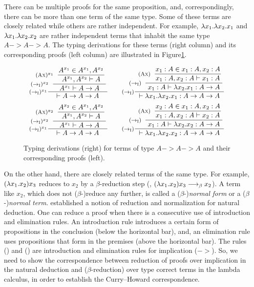 There can be multiple proofs for the same proposition, and,
correspondingly, there can be more than one term of the same type.
Some of these terms are closely related while others are rather independent.
For example, $\lambda x_1.\lambda x_2.x_1$ and $\lambda x_1.\lambda x_2.x_2$ are rather 
independent terms that inhabit the same type $A -> A -> A$.
The typing derivations for these terms (right column) and
its corresponding proofs (left column) are illustrated in
Figure\;\ref{fig:proofAAA}.
\begin{figure}
\[\setpremisesend{.1em}
\inference[$(->_\textsc{I})^{x_1}$]
	{\hspace*{-3em}
	 \inference[$(->_\textsc{I})^{x_2}$]
	 	{\hspace*{-3em}
		 \inference[$(\textsc{Ax})^{x_1}$]
			{A^{x_1}\in A^{x_1},A^{x_2}}
			{A^{x_1},A^{x_2} |- A} }
		{A^{x_1} |- A -> A} }
	{|- A -> A -> A }
\qquad
\inference[($->_\textsc{I}$)]
	{\hspace*{-1.3em}
	 \inference[($->_\textsc{I}$)]
		{\hspace*{-1.5em}
		 \inference[(\textsc{Ax})]
			{x_1 : A \in x_1 : A, x_2 : A}
			{x_1 : A, x_2 : A |- x_1 : A} }
		{x_1 : A |- \l x_2.x_1 : A -> A} }
	{|- \l x_1.\l x_2.x_1 : A -> A -> A }
\]
\[\setpremisesend{.1em}
\inference[$(->_\textsc{I})^{x_1}$]
	{\hspace*{-3em}
	 \inference[$(->_\textsc{I})^{x_2}$]
		{\hspace*{-3em}
		 \inference[$(\textsc{Ax})^{x_2}$]
			{A^{x_2}\in A^{x_1},A^{x_2}}
			{A^{x_1},A^{x_2} |- A} }
		{A^{x_1} |- A -> A} }
	{|- A -> A -> A }
\qquad
\inference[($->_\textsc{I}$)]
	{\hspace*{-1.3em}
	 \inference[($->_\textsc{I}$)]
		{\hspace*{-1.5em}
		 \inference[(\textsc{Ax})]
			{x_2 : A \in x_1 : A, x_2 : A}
			{x_1 : A, x_2 : A |- x_2 : A} }
		{x_1 : A |- \l x_2.x_2 : A -> A} }
	{|- \l x_1.\l x_2.x_2 : A -> A -> A }
\]
\caption{Typing derivations (right) for terms of type $A -> A -> A$
	and their corresponding proofs (left).}
\label{fig:proofAAA}
\end{figure}

On the other hand, there are closely related terms of the same type.
For example, $(\lambda x_1.x_2) x_3$ reduces to $x_2$ by a $\beta$-reduction step
(\ie, $(\lambda x_1.x_2) x_3 -->_\beta x_2$). A term like $x_2$, which does not
($\beta$-)reduce any further, is called a ($\beta$-)\emph{normal form} or
a ($\beta$-)\emph{normal term}. \citet{Pra65} established a notion of
reduction and normalization for natural deduction. One can reduce a proof
when there is a consecutive use of introduction and elimination rules.
An introduction rule introduces a certain form of propositions
in the conclusion (below the horizontal bar), and, an elimination rule
uses propositions that form in the premises (above the horizontal bar).
The rules () and ()
are introduction and elimination rules for implication ($->$).
So, we need to show the correspondence between reduction of proofs
over implication in the natural deduction and ($\beta$-reduction) over
type correct terms in the lambda calculus,
in order to establish the Curry--Howard correspondence.

